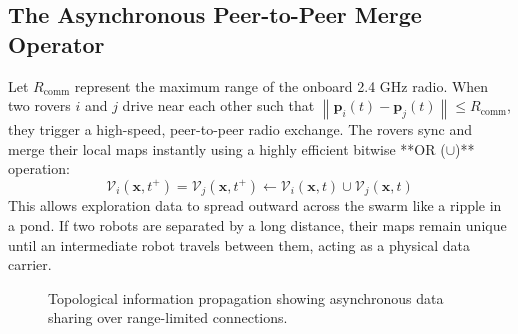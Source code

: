 \documentclass[letterpaper, 10pt, conference]{IEEEtran}
\newcommand{\norm}[1]{\left\lVert#1\right\rVert}
\begin{document}
\subsection{The Asynchronous Peer-to-Peer Merge Operator}
Let $R_{\text{comm}}$ represent the maximum range of the onboard 2.4 GHz radio. When two rovers $i$ and $j$ drive near each other such that $\norm{\mathbf{p}_i(t) - \mathbf{p}_j(t)} \leq R_{\text{comm}}$, they trigger a high-speed, peer-to-peer radio exchange. The rovers sync and merge their local maps instantly using a highly efficient bitwise **OR ($\cup$)** operation:
\begin{equation}
    \mathcal{V}_i(\mathbf{x}, t^+) = \mathcal{V}_j(\mathbf{x}, t^+) \leftarrow \mathcal{V}_i(\mathbf{x}, t) \cup \mathcal{V}_j(\mathbf{x}, t)
\end{equation}
This allows exploration data to spread outward across the swarm like a ripple in a pond. If two robots are separated by a long distance, their maps remain unique until an intermediate robot travels between them, acting as a physical data carrier.

\begin{figure}[htbp]
  \centering
  \caption{Topological information propagation showing asynchronous data sharing over range-limited connections.}
  \label{fig:stigmergy_diffusion}
\end{figure}
\end{document}
